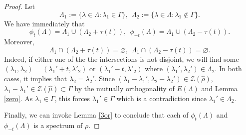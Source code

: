 \documentclass[10pt,a4paper]{amsart}
\begin{document}
\begin{proof}
Let
\[
\Lambda_{1}:=\{\lambda\in \Lambda:\lambda_{1}\in \Gamma\},\ \ \Lambda_{2}:=\{\lambda\in \Lambda:\lambda_{1}\notin \Gamma\}.
\]
We have immediately that 
$$
\phi_{t}(\Lambda)=\Lambda_{1}\cup(\Lambda_{2}+\tau(t)), \ \ \phi_{-t}(\Lambda)=\Lambda_{1}\cup(\Lambda_{2}-\tau(t)).$$
Moreover,
$$\Lambda_{1}\cap(\Lambda_{2}+\tau(t))=\varnothing, \ \ \Lambda_{1}\cap (\Lambda_{2}-\tau(t))=\varnothing.$$
Indeed, if either one of the the intersections is not disjoint, we will find some $(\lambda_1,\lambda_2) = (\lambda_1'+t,\lambda'_2)$ or $(\lambda_1'-t,\lambda'_2)$ where $(\lambda_1',\lambda_2')\in\Lambda_2$. In both cases, it implies that $\lambda_2 = \lambda_2'$. Since $(\lambda_1-\lambda_1',\lambda_2-\lambda_2')\in{\mathcal Z}(\widehat{\rho})$,   $\lambda_1-\lambda_1'\in{\mathcal Z}(\widehat{\mu})\subset \Gamma$ by the mutually orthogonality of $E(\Lambda)$ and Lemma \ref{zero}. As $\lambda_1\in\Gamma$, this forces $\lambda_1'\in\Gamma$ which is a contradiction since $\lambda_1'\in\Lambda_2$.

Finally, we can invoke  Lemma \ref{3or} to conclude that {each of} $\phi_{t}(\Lambda)$ and $\phi_{-t}(\Lambda)$ is a spectrum of $\rho$.
\end{proof}
\end{document}
